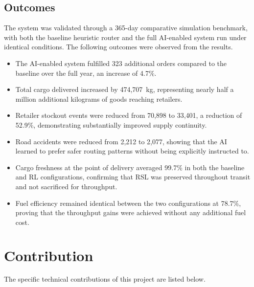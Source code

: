 \subsection{Outcomes}

The system was validated through a 365-day comparative simulation benchmark, with
both the baseline heuristic router and the full AI-enabled system run under
identical conditions. The following outcomes were observed from the results.

\begin{itemize}
    \item The AI-enabled system fulfilled 323 additional orders compared to the
    baseline over the full year, an increase of 4.7\%.
    \item Total cargo delivered increased by 474,707~kg, representing nearly half
    a million additional kilograms of goods reaching retailers.
    \item Retailer stockout events were reduced from 70,898 to 33,401, a reduction
    of 52.9\%, demonstrating substantially improved supply continuity.
    \item Road accidents were reduced from 2,212 to 2,077, showing that the AI
    learned to prefer safer routing patterns without being explicitly instructed to.
    \item Cargo freshness at the point of delivery averaged 99.7\% in both the
    baseline and RL configurations, confirming that RSL was preserved throughout
    transit and not sacrificed for throughput.
    \item Fuel efficiency remained identical between the two configurations at
    78.7\%, proving that the throughput gains were achieved without any additional
    fuel cost.
\end{itemize}

\section{Contribution}

The specific technical contributions of this project are listed below.

